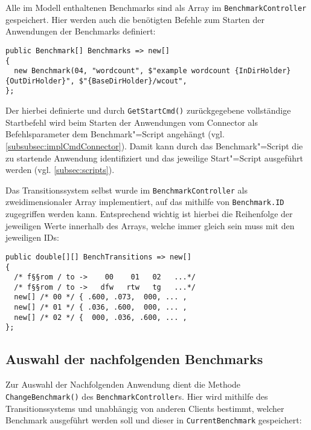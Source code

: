 Alle im Modell enthaltenen Benchmarks sind als Array im \texttt{BenchmarkController} gespeichert.
Hier werden auch die benötigten Befehle zum Starten der Anwendungen der Benchmarks definiert:

\begin{lstlisting}[label=lst:benchmarkDefinition,style=cs,
caption={[Definition der verfügbaren Benchmarks im BenchmarkController]
    Definition der verfügbaren Benchmarks im \texttt{BenchmarkController} (gekürzt)}]
public Benchmark[] Benchmarks => new[]
{
  new Benchmark(04, "wordcount", $"example wordcount {InDirHolder} {OutDirHolder}", $"{BaseDirHolder}/wcout",
};
\end{lstlisting}

Der hierbei definierte und durch \texttt{GetStartCmd()} zurückgegebene vollständige Startbefehl wird beim Starten der Anwendungen vom Connector als Befehlsparameter dem Benchmark"=Script angehängt (vgl. \cref{subsubsec:implCmdConnector}).
Damit kann durch das Benchmark"=Script die zu startende Anwendung identifiziert und das jeweilige Start"=Script ausgeführt werden (vgl. \cref{subsec:scripts}).

Das Transitionssystem selbst wurde im \texttt{BenchmarkController} als zweidimensionaler Array implementiert, auf das mithilfe von \texttt{Benchmark.ID} zugegriffen werden kann.
Entsprechend wichtig ist hierbei die Reihenfolge der jeweiligen Werte innerhalb des Arrays, welche immer gleich sein muss mit den jeweiligen IDs:

\begin{lstlisting}[label=lst:transitionSystemImpl,style=cs,
caption={[Implementierung des Transitionssystems im BenchmarkController]
    Implementierung des Transitionssystems im \texttt{BenchmarkController} (gekürzt)}]
public double[][] BenchTransitions => new[]
{
  /* f§§rom / to ->    00    01   02   ...*/
  /* f§§rom / to ->   dfw   rtw   tg   ...*/
  new[] /* 00 */ { .600, .073,  000, ... ,
  new[] /* 01 */ { .036, .600,  000, ... ,
  new[] /* 02 */ {  000, .036, .600, ... ,
};
\end{lstlisting}

\subsection{Auswahl der nachfolgenden Benchmarks}
\label{subsec:selectionNextBenchmark}

Zur Auswahl der Nachfolgenden Anwendung dient die Methode \texttt{ChangeBenchmark()} des \texttt{BenchmarkController}s.
Hier wird mithilfe des Transitionssystems und unabhängig von anderen Clients bestimmt, welcher Benchmark ausgeführt werden soll und dieser in \texttt{CurrentBenchmark} gespeichert:

